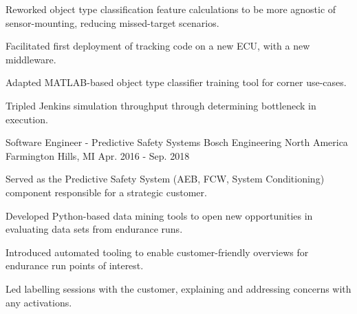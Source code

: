 \begin{cventries}
{\begin{cvitems}
        \item {Reworked object type classification feature calculations to be more agnostic of sensor-mounting, reducing missed-target scenarios.}
        \iflongform        
          \item {Facilitated first deployment of tracking code on a new ECU, with a new middleware.}
          \item {Adapted MATLAB-based object type classifier training tool for corner use-cases.}
          \item {Tripled Jenkins simulation throughput through determining bottleneck in execution.}
        \fi
      \end{cvitems}
    }

  \cventry
    {Software Engineer - Predictive Safety Systems} %
    {Bosch Engineering North America} %
    {Farmington Hills, MI} %
    {Apr. 2016 - Sep. 2018} %
    {
      \begin{cvitems} %
        \item {Served as the Predictive Safety System (AEB, FCW, System Conditioning) component responsible for a strategic customer.}
        \item {Developed Python-based data mining tools to open new opportunities in evaluating data sets from endurance runs.}
        \item {Introduced automated tooling to enable customer-friendly overviews for endurance run points of interest.}
        \item {Led labelling sessions with the customer, explaining and addressing concerns with any activations.}
      \end{cvitems}
    }


\end{cventries}
